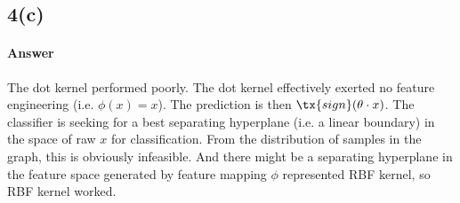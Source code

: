 \documentclass[11pt]{article}
\begin{document}
	\newpage
	\subsection{4(c)}
	\paragraph{Answer} The dot kernel performed poorly. The dot kernel effectively exerted no feature engineering (i.e. $\phi(x) = x$). The prediction is then $\tx{sign}(\theta \cdot x)$. The classifier is seeking for a best separating hyperplane (i.e. a linear boundary) in the space of raw $x$ for classification. From the distribution of samples in the graph, this is obviously infeasible. And there might be a separating hyperplane in the feature space generated by feature mapping $\phi$ represented RBF kernel, so RBF kernel worked.
\end{document}
